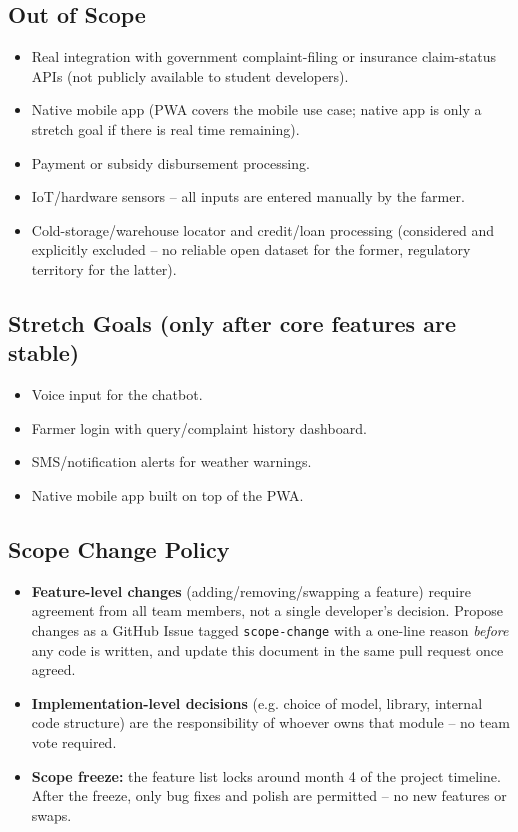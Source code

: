 \documentclass[11pt,a4paper]{article}
\begin{document}
\subsection{Out of Scope}
\begin{itemize}[leftmargin=*]
  \item Real integration with government complaint-filing or insurance
    claim-status APIs (not publicly available to student developers).
  \item Native mobile app (PWA covers the mobile use case; native app is
    only a stretch goal if there is real time remaining).
  \item Payment or subsidy disbursement processing.
  \item IoT/hardware sensors -- all inputs are entered manually by the
    farmer.
  \item Cold-storage/warehouse locator and credit/loan processing
    (considered and explicitly excluded -- no reliable open dataset for
    the former, regulatory territory for the latter).
\end{itemize}

\subsection{Stretch Goals (only after core features are stable)}
\begin{itemize}[leftmargin=*]
  \item Voice input for the chatbot.
  \item Farmer login with query/complaint history dashboard.
  \item SMS/notification alerts for weather warnings.
  \item Native mobile app built on top of the PWA.
\end{itemize}

\subsection{Scope Change Policy}
\begin{itemize}[leftmargin=*]
  \item \textbf{Feature-level changes} (adding/removing/swapping a
    feature) require agreement from all team members, not a single
    developer's decision. Propose changes as a GitHub Issue tagged
    \texttt{scope-change} with a one-line reason \emph{before} any code
    is written, and update this document in the same pull request once
    agreed.
  \item \textbf{Implementation-level decisions} (e.g. choice of model,
    library, internal code structure) are the responsibility of whoever
    owns that module -- no team vote required.
  \item \textbf{Scope freeze:} the feature list locks around month 4 of
    the project timeline. After the freeze, only bug fixes and polish are
    permitted -- no new features or swaps.
\end{itemize}
\end{document}
